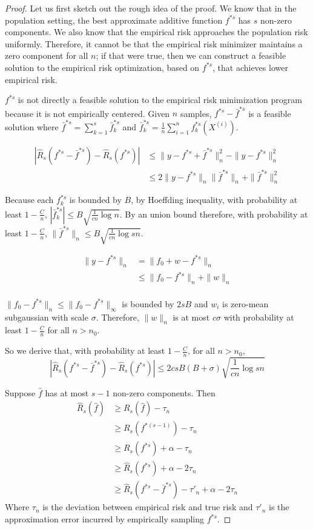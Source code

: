\begin{proof}
Let us first sketch out the rough idea of the proof. We know that in the population setting, the best approximate additive function $f^{*s}$ has $s$ non-zero components. We also know that the empirical risk approaches the population risk uniformly. Therefore, it cannot be that the empirical risk minimizer maintains a zero component for all $n$; if that were true, then we can construct a feasible solution to the empirical risk optimization, based on $f^{*s}$, that achieves lower empirical risk. 


$f^{*s}$ is not directly a feasible solution to the empirical risk minimization program because it is not empirically centered. Given $n$ samples, $f^{*s} - \bar{f}^{*s}$ is a feasible solution where $\bar{f}^{*s} = \sum_{k=1}^s \bar{f}_k^{*s}$ and $\bar{f}_k^{*s} = \frac{1}{n} \sum_{i=1}^n f_k^{*s}(X^{(i)})$. 

\begin{align*}
|\hat{R}_s(f^{*s} - \bar{f}^{*s}) - \hat{R}_s(f^{*s})| &\leq \| y - f^{*s} + \bar{f}^{*s} \|_n^2  - \| y - f^{*s}\|_n^2 \\
	&\leq 2\|y-f^{*s}\|_n \|\bar{f}^{*s}\|_n + \|\bar{f}^{*s}\|_n^2 
\end{align*}

Because each $f_k^{*s}$ is bounded by $B$, by Hoeffding inequality, with probability at least $1-\frac{C}{n}$, $|\bar{f}_k^{*s}| \leq B\sqrt{\frac{1}{cn} \log n}$. By an union bound therefore, with probability at least $1-\frac{C}{n}$, $\|\bar{f}^{*s}\|_n \leq B\sqrt{\frac{1}{cn} \log sn}$.

\begin{align*}
\| y - f^{*s} \|_n &= \| f_0 + w - f^{*s} \|_n \\
	&\leq \| f_0 - f^{*s} \|_n + \|w\|_n \\
\end{align*}

$\|f_0 - f^{*s}\|_n \leq \|f_0 - f^{*s}\|_\infty $ is bounded by $2sB$ and $w_i$ is zero-mean subgaussian with scale $\sigma$. Therefore, $\|w\|_n$ is at most $c\sigma$ with probability at least $1-\frac{C}{n}$ for all $n > n_0$. 

So we derive that, with probability at least $1 -\frac{C}{n}$, for all $n > n_0$,
\[
|\hat{R}_s(f^{*s} - \bar{f}^{*s}) - \hat{R}_s(f^{*s})| \leq 2csB(B+\sigma) \sqrt{\frac{1}{cn} \log sn}
\]

Suppose $\hat{f}$ has at most $s-1$ non-zero components. Then
\begin{align*}
\hat{R}_s( \hat{f}) &\geq R_s(\hat{f}) - \tau_n \\
	&\geq R_s(f^{*(s-1)}) - \tau_n \\
	&\geq R_s(f^{*s}) + \alpha - \tau_n \\
	&\geq \hat{R}_s(f^{*s}) + \alpha - 2 \tau_n \\
	&\geq \hat{R}_s(f^{*s} - \bar{f}^{*s}) -\tau'_n + \alpha - 2\tau_n 
\end{align*}
Where $\tau_n$ is the deviation between empirical risk and true risk and $\tau'_n$ is the approximation error incurred by empirically sampling $f^{*s}$.


\end{proof}
